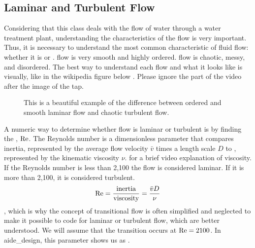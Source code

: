 \documentclass[letterpaper,10pt,english]{sphinxmanual}
\let\sphinxpxdimen\pdfpxdimen\else\newdimen\sphinxpxdimen
\begin{document}
\subsection{Laminar and Turbulent Flow}
\label{\detokenize{Fluids_Review/Fluids_Review_Design:laminar-and-turbulent-flow}}\label{\detokenize{Fluids_Review/Fluids_Review_Design:id4}}
Considering that this class deals with the flow of water through a water treatment plant, understanding the characteristics of the flow is very important. Thus, it is necessary to understand the most common characteristic of fluid flow: whether it is  or      .  flow is very smooth and highly ordered.  flow is chaotic, messy, and disordered. The best way to understand each flow and what it looks like is visually, like in the wikipedia figure below . Please ignore the part of the video after the image of the tap.

\begin{figure}[htbp]
\centering
\capstart

\noindent\sphinxincludegraphics[width=400\sphinxpxdimen]{{Wikipedia_laminar_turbulent}.png}
\caption{This is a beautiful example of the difference between ordered and smooth laminar flow and chaotic turbulent flow.}\label{\detokenize{Fluids_Review/Fluids_Review_Design:id13}}\label{\detokenize{Fluids_Review/Fluids_Review_Design:wikipedia-laminar-turbulent}}\end{figure}

A numeric way to determine whether flow is laminar or turbulent is by finding the , \({\rm Re}\). The Reynolds number is a dimensionless parameter that compares inertia, represented by the average flow velocity \(\bar v\) times a length scale \(D\) to , represented by the kinematic viscosity \(\nu\).  for a brief video explanation of viscosity. If the Reynolds number is less than 2,100 the flow is considered laminar. If it is more than 2,100, it is considered turbulent.
\begin{equation}\label{equation:Fluids_Review/Fluids_Review_Design:Fluids_Review/Fluids_Review_Design:4}
\begin{split}{\rm Re = \frac{inertia}{viscosity}} = \frac{\bar vD}{\nu}\end{split}
\end{equation}
, which is why the concept of transitional flow is often simplified and neglected to make it possible to code for laminar or turbulent flow, which are better understood. We will assume that the transition occurs at \(\rm{Re} = 2100\). In aide\_design, this parameter shows us as .
\end{document}
